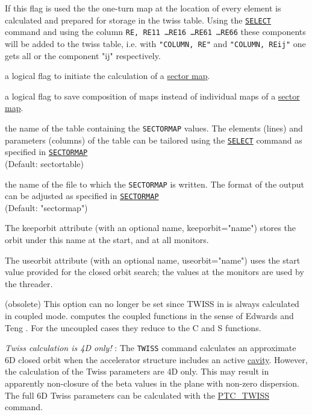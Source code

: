 \begin{madlist}
   If this flag is used the the one-turn map at the
  location of every element is calculated and prepared for
  storage in the twiss table. Using the
  \hyperref[sec:select]{\texttt{SELECT}} command and using
  the column \texttt{RE, RE11 \ldots RE16 \ldots RE61 \ldots RE66} these
  components will be added to the twiss table, i.e. with \texttt{"COLUMN, RE"} and
  \texttt{"COLUMN, REij"} one gets all or the component "ij" respectively.    

   a logical flag to initiate the calculation of a 
  \hyperref[sec:sectormap]{sector map}.
  
   a logical flag to save composition of maps instead of individual maps of a
  \hyperref[sec:sectormap]{sector map}.

   the name of the table containing the \texttt{SECTORMAP}
  values. The elements (lines) and parameters (columns) 
  of the table can be tailored using the \hyperref[sec:select]{\texttt{SELECT}} 
  command as specified in \hyperref[sec:sectormap]{\texttt{SECTORMAP}} \\
  (Default: sectortable)

   the name of the file to which the \texttt{SECTORMAP} is
  written. 
  The format of the output can be adjusted as specified in 
  \hyperref[sec:sectormap]{\texttt{SECTORMAP}} \\
  (Default: "sectormap")
  
   The keeporbit attribute (with an optional name,
  keeporbit="name") stores the orbit under this name at the
  start, and at all monitors.    

   The useorbit attribute (with an optional name,
  useorbit="name") uses the start value provided for the closed
  orbit search; the values at the monitors are used by the
  threader.    

   (obsolete) This \madeight option can no
  longer be set since TWISS in \madx is always calculated in
  coupled mode. \madx computes the coupled functions in the
  sense of Edwards and Teng \cite{edwards1973}. 
  For the uncoupled cases they reduce to the C and S functions.    
  
  \textit{ Twiss calculation is 4D only!} : The \texttt{TWISS}
  command calculates an approximate 6D closed orbit when the
  accelerator structure includes an active
  \hyperref[sec:rfcavity]{cavity}. However, the
  calculation of the Twiss parameters are 4D only. This may
  result in apparently non-closure of the beta values in the
  plane with non-zero dispersion. The full 6D Twiss parameters
  can be calculated with the
  \hyperref[chap:ptc-twiss]{PTC\_TWISS} command.    


\end{madlist}
